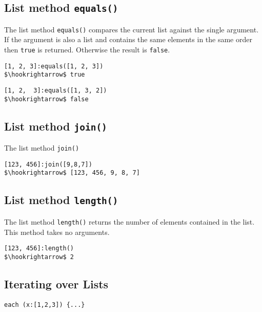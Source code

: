 \documentclass[11pt,a4paper]{scrbook}
\begin{document}
\subsection{List method \texttt{equals()}}

The list method \texttt{equals()} compares the current list against the single
argument. If the argument is also a list and contains the same elements in the
same order then \verb|true| is returned. Otherwise the result is \verb|false|.

\begin{lstlisting}[language=BibTool,mathescape=true]
[1, 2, 3]:equals([1, 2, 3])
$\hookrightarrow$ true
\end{lstlisting}

\begin{lstlisting}[language=BibTool,mathescape=true]
[1, 2,  3]:equals([1, 3, 2])
$\hookrightarrow$ false
\end{lstlisting}

\subsection{List method \texttt{join()}}

The list method \texttt{join()}

\begin{lstlisting}[language=BibTool,mathescape=true]
[123, 456]:join([9,8,7])
$\hookrightarrow$ [123, 456, 9, 8, 7]
\end{lstlisting}

\subsection{List method \texttt{length()}}

The list method \texttt{length()} returns the number of elements contained in
the list. This method takes no arguments.

\begin{lstlisting}[language=BibTool,mathescape=true]
[123, 456]:length()
$\hookrightarrow$ 2
\end{lstlisting}

\subsection{Iterating over Lists}


\begin{lstlisting}[language=BibTool,mathescape=true]
each (x:[1,2,3]) {...}
\end{lstlisting}
\end{document}
